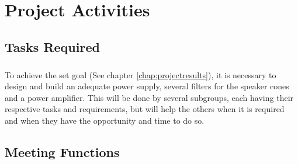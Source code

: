 \chapter{Project Activities} 
\label{chap:projectactivities}
\section{Tasks Required}
\paragraph{}
 To achieve the set goal (See chapter \ref{chap:projectresults}), it is necessary to design and build an adequate power supply, several filters for the speaker cones and a power amplifier. This will be done by several subgroups, each having their respective tasks and requirements, but will help the others when it is required and when they have the opportunity and time to do so.
 
\section{Meeting Functions}

